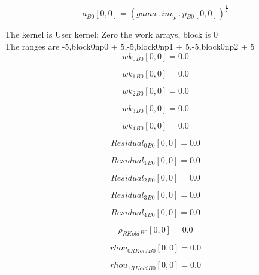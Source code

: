 \documentclass{article}
\begin{document}
\begin{dmath}{a{_{B0}}}[{0,0}] = \left(gama \,.\, inv_{\rho} \,.\, {p{_{B0}}}[{0,0}] \right)^{\frac{1}{2}}\end{dmath}

\noindent The kernel is User kernel: Zero the work arrays, block is 0\\\noindent The ranges are -5,block0np0 + 5,-5,block0np1 + 5,-5,block0np2 + 5\\\begin{dmath}{wk_{0}{_{B0}}}[{0,0}] = 0.0\end{dmath}

\begin{dmath}{wk_{1}{_{B0}}}[{0,0}] = 0.0\end{dmath}

\begin{dmath}{wk_{2}{_{B0}}}[{0,0}] = 0.0\end{dmath}

\begin{dmath}{wk_{3}{_{B0}}}[{0,0}] = 0.0\end{dmath}

\begin{dmath}{wk_{4}{_{B0}}}[{0,0}] = 0.0\end{dmath}

\begin{dmath}{Residual_{0}{_{B0}}}[{0,0}] = 0.0\end{dmath}

\begin{dmath}{Residual_{1}{_{B0}}}[{0,0}] = 0.0\end{dmath}

\begin{dmath}{Residual_{2}{_{B0}}}[{0,0}] = 0.0\end{dmath}

\begin{dmath}{Residual_{3}{_{B0}}}[{0,0}] = 0.0\end{dmath}

\begin{dmath}{Residual_{4}{_{B0}}}[{0,0}] = 0.0\end{dmath}

\begin{dmath}{\rho_{RKold}{_{B0}}}[{0,0}] = 0.0\end{dmath}

\begin{dmath}{rhou_{0 RKold}{_{B0}}}[{0,0}] = 0.0\end{dmath}

\begin{dmath}{rhou_{1 RKold}{_{B0}}}[{0,0}] = 0.0\end{dmath}
\end{document}
